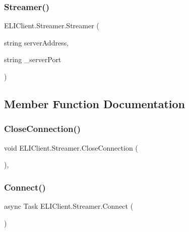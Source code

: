\subsubsection{\texorpdfstring{Streamer()}{Streamer()}}
{\footnotesize\ttfamily E\+L\+I\+Client.\+Streamer.\+Streamer (\begin{DoxyParamCaption}\item[{string}]{server\+Address,  }\item[{string}]{\+\_\+server\+Port }\end{DoxyParamCaption})\hspace{0.3cm}{\ttfamily [inline]}}



\subsection{Member Function Documentation}
\mbox{\label{class_e_l_i_client_1_1_streamer_a7825ae64d0072b8241d29d356befe42c}} 
\subsubsection{\texorpdfstring{Close\+Connection()}{CloseConnection()}}
{\footnotesize\ttfamily void E\+L\+I\+Client.\+Streamer.\+Close\+Connection (\begin{DoxyParamCaption}{ }\end{DoxyParamCaption})\hspace{0.3cm}{\ttfamily [inline]}, {\ttfamily [package]}}

\mbox{\label{class_e_l_i_client_1_1_streamer_aee0823494f123fb1a8ad2ab136cf74f5}} 
\subsubsection{\texorpdfstring{Connect()}{Connect()}}
{\footnotesize\ttfamily async Task E\+L\+I\+Client.\+Streamer.\+Connect (\begin{DoxyParamCaption}{ }\end{DoxyParamCaption})\hspace{0.3cm}{\ttfamily [inline]}}

